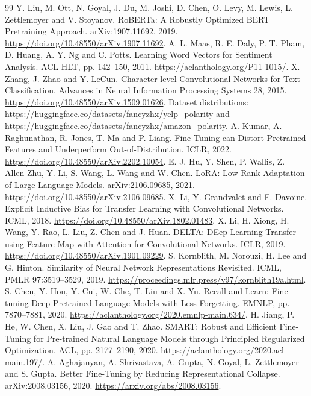 \documentclass[a4paper,10pt]{article}
\begin{document}
\clearpage
\begin{thebibliography}{99}
 Y. Liu, M. Ott, N. Goyal, J. Du, M. Joshi, D. Chen, O. Levy, M. Lewis, L. Zettlemoyer and V. Stoyanov. RoBERTa: A Robustly Optimized BERT Pretraining Approach. arXiv:1907.11692, 2019. \url{https://doi.org/10.48550/arXiv.1907.11692}.
 A. L. Maas, R. E. Daly, P. T. Pham, D. Huang, A. Y. Ng and C. Potts. Learning Word Vectors for Sentiment Analysis. ACL-HLT, pp. 142--150, 2011. \url{https://aclanthology.org/P11-1015/}.
 X. Zhang, J. Zhao and Y. LeCun. Character-level Convolutional Networks for Text Classification. Advances in Neural Information Processing Systems 28, 2015. \url{https://doi.org/10.48550/arXiv.1509.01626}. Dataset distributions: \url{https://huggingface.co/datasets/fancyzhx/yelp_polarity} and \url{https://huggingface.co/datasets/fancyzhx/amazon_polarity}.
 A. Kumar, A. Raghunathan, R. Jones, T. Ma and P. Liang. Fine-Tuning can Distort Pretrained Features and Underperform Out-of-Distribution. ICLR, 2022. \url{https://doi.org/10.48550/arXiv.2202.10054}.
 E. J. Hu, Y. Shen, P. Wallis, Z. Allen-Zhu, Y. Li, S. Wang, L. Wang and W. Chen. LoRA: Low-Rank Adaptation of Large Language Models. arXiv:2106.09685, 2021. \url{https://doi.org/10.48550/arXiv.2106.09685}.
 X. Li, Y. Grandvalet and F. Davoine. Explicit Inductive Bias for Transfer Learning with Convolutional Networks. ICML, 2018. \url{https://doi.org/10.48550/arXiv.1802.01483}.
 X. Li, H. Xiong, H. Wang, Y. Rao, L. Liu, Z. Chen and J. Huan. DELTA: DEep Learning Transfer using Feature Map with Attention for Convolutional Networks. ICLR, 2019. \url{https://doi.org/10.48550/arXiv.1901.09229}.
 S. Kornblith, M. Norouzi, H. Lee and G. Hinton. Similarity of Neural Network Representations Revisited. ICML, PMLR 97:3519--3529, 2019. \url{https://proceedings.mlr.press/v97/kornblith19a.html}.
 S. Chen, Y. Hou, Y. Cui, W. Che, T. Liu and X. Yu. Recall and Learn: Fine-tuning Deep Pretrained Language Models with Less Forgetting. EMNLP, pp. 7870--7881, 2020. \url{https://aclanthology.org/2020.emnlp-main.634/}.
 H. Jiang, P. He, W. Chen, X. Liu, J. Gao and T. Zhao. SMART: Robust and Efficient Fine-Tuning for Pre-trained Natural Language Models through Principled Regularized Optimization. ACL, pp. 2177--2190, 2020. \url{https://aclanthology.org/2020.acl-main.197/}.
 A. Aghajanyan, A. Shrivastava, A. Gupta, N. Goyal, L. Zettlemoyer and S. Gupta. Better Fine-Tuning by Reducing Representational Collapse. arXiv:2008.03156, 2020. \url{https://arxiv.org/abs/2008.03156}.
\end{thebibliography}
\end{document}
